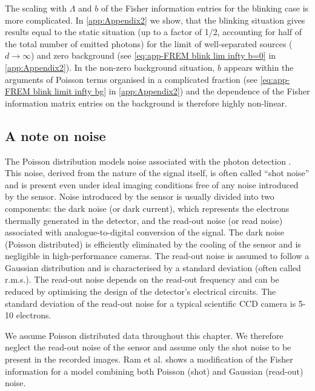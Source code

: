 The scaling with $\Lambda$ and $b$ of the Fisher information entries for the blinking case is more complicated. In \autoref{app:Appendix2} we show, that the blinking situation gives results equal to the static situation (up to a factor of 1/2, accounting for half of the total number of emitted photons) for the limit of well-separated sources ($d\rightarrow\infty$) and zero background (see \autoref{eq:app-FREM blink lim infty b=0} in \autoref{app:Appendix2}). In the non-zero background situation, $b$ appears within the arguments of Poisson terms organised in a complicated fraction (see \autoref{eq:app-FREM blink limit infty bg} in \autoref{app:Appendix2}) and the dependence of the Fisher information matrix entries on the background is therefore highly non-linear.  


\subsection{A note on noise\label{sub:noise}}

The Poisson distribution models noise associated with the photon detection \cite{PawleyHandbook2006}. This noise, derived from the nature of the signal itself, is often called ``shot noise'' \cite{Schottky1918} and is present even under ideal imaging conditions free of any noise introduced by the sensor. Noise introduced by the sensor is usually divided into two components: the dark noise (or dark current), which represents the electrons thermally generated in the detector, and the read-out noise (or read noise) associated with analogue-to-digital conversion of the signal. The dark noise (Poisson distributed) is efficiently eliminated by the cooling of the sensor and is negligible in high-performance cameras.  The read-out noise is assumed to follow a Gaussian distribution and is characterised by a standard deviation (often called r.m.s.).  The read-out noise depends on the read-out frequency and can be reduced by optimising the design of the detector's electrical circuits. The standard deviation of the read-out noise for a typical scientific CCD camera is 5-10 electrons. 

We assume Poisson distributed data throughout this chapter. We therefore neglect the read-out noise of the sensor and assume only the shot noise to be present in the recorded images. Ram et al. \cite{Ram2006} shows a modification of the Fisher information for a model combining both Poisson (shot) and Gaussian (read-out) noise.

